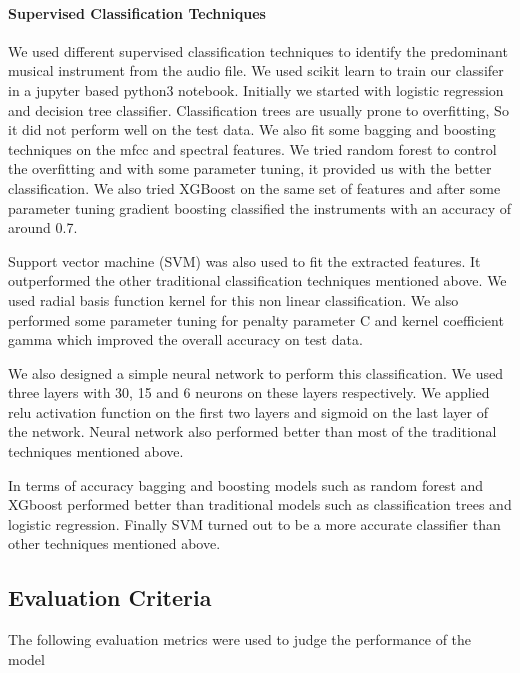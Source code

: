 \documentclass{article}
\begin{document}
\paragraph{Supervised Classification Techniques}
We used different supervised classification techniques to identify the predominant musical instrument from the audio file. We used scikit learn\cite{scikit} to train our classifer in a jupyter based python3 notebook. Initially we started with logistic regression and decision tree classifier. Classification trees are usually prone to overfitting, So it did not perform well on the test data. We also fit some bagging and boosting techniques on the mfcc and spectral features. We tried random forest to control the overfitting and with some parameter tuning, it provided us with the better classification. We also tried XGBoost on the same set of features and after some parameter tuning gradient boosting classified the instruments with an accuracy of around 0.7. 


Support vector machine (SVM) was also used to fit the extracted features. It outperformed the other traditional classification techniques mentioned above. We used radial basis function kernel for this non linear classification. We also performed some parameter tuning for penalty parameter C and kernel coefficient gamma which improved the overall accuracy on test data.


We also designed a simple neural network to perform this classification. We used three layers with 30, 15 and 6 neurons on these layers respectively. We applied relu activation function on the first two layers and sigmoid on the last layer of the network. Neural network also performed better than most of the traditional techniques mentioned above.


In terms of accuracy bagging and boosting models such as random forest and XGboost performed better than traditional models such as classification trees and logistic regression. Finally SVM turned out to be a more accurate classifier than other techniques mentioned above.

\subsection{Evaluation Criteria}

The following evaluation metrics were used to judge the performance of the model
\end{document}
